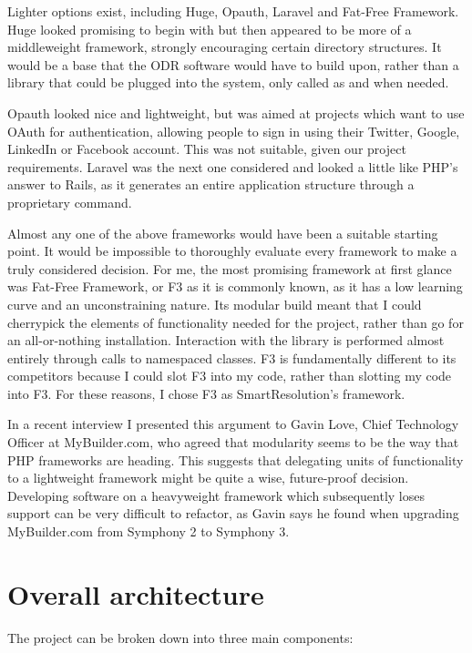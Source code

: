 Lighter options exist, including Huge, Opauth, Laravel and Fat-Free Framework. Huge looked promising to begin with but then appeared to be more of a middleweight framework, strongly encouraging certain directory structures. It would be a base that the ODR software would have to build upon, rather than a library that could be plugged into the system, only called as and when needed.

Opauth looked nice and lightweight, but was aimed at projects which want to use OAuth for authentication, allowing people to sign in using their Twitter, Google, LinkedIn or Facebook account. This was not suitable, given our project requirements. Laravel was the next one considered and looked a little like PHP's answer to Rails, as it generates an entire application structure through a proprietary command.

Almost any one of the above frameworks would have been a suitable starting point. It would be impossible to thoroughly evaluate every framework to make a truly considered decision. For me, the most promising framework at first glance was Fat-Free Framework, or F3 as it is commonly known, as it has a low learning curve and an unconstraining nature. Its modular build meant that I could cherrypick the elements of functionality needed for the project, rather than go for an all-or-nothing installation. Interaction with the library is performed almost entirely through calls to namespaced classes. F3 is fundamentally different to its competitors because I could slot F3 into my code, rather than slotting my code into F3. For these reasons, I chose F3 as SmartResolution's framework.

In a recent interview I presented this argument to Gavin Love, Chief Technology Officer at MyBuilder.com, who agreed that modularity seems to be the way that PHP frameworks are heading. This suggests that delegating units of functionality to a lightweight framework might be quite a wise, future-proof decision. Developing software on a heavyweight framework which subsequently loses support can be very difficult to refactor, as Gavin says he found when upgrading MyBuilder.com from Symphony 2 to Symphony 3.

\section{Overall architecture}

The project can be broken down into three main components:

